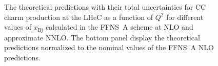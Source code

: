 \documentclass[pdftex,twocolumn,epjc3]{svjour3}          %
\newcommand{\xbj}{\ensuremath{x_{\text{Bj}}}\xspace}
\newcommand{\fonll} {{FONLL-B}\xspace}
\newcommand{\ffns} {{FFNS~A}\xspace}
\newcommand{\ffnsb} {{FFNS~B}\xspace}
\newcommand{\ffthreea} {{\hbox{HERAPDF2.0} FF3A}\xspace}
\newcommand{\ffthreeb} {{\hbox{HERAPDF2.0} FF3B}\xspace}
\begin{document}
%
%

\begin{figure}
  \centering
  \caption{The theoretical predictions with their total uncertainties
    for CC charm production at the LHeC as a function of $Q^2$ for
    different values of \xbj calculated in the \ffns scheme at NLO and
    approximate NNLO. The bottom panel display the theoretical
    predictions normalized to the nominal values of the \ffns NLO
    predictions.}
  \label{fig:thpred-q2-nnlo}
\end{figure}
\end{document}
